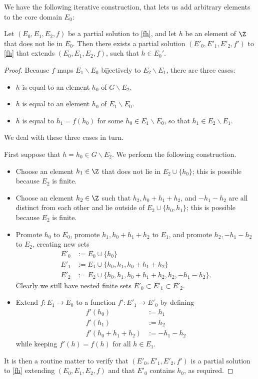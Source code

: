 We have the following iterative construction, that lets us add arbitrary elements to the core domain $E_0$:

\begin{lemma}\label{iteration} Let $(E_0, E_1, E_2, f)$ be a partial solution to \eqref{fh}, and let $h$ be an element of $\Z$ that does not lie in $E_0$.  Then there exists a partial solution $(E'_0, E'_1, E'_2, f')$ to \eqref{fh} that extends $(E_0, E_1, E_2, f)$, such that $h \in E_0'$.
\end{lemma}

\begin{proof}  Because $f$ maps $E_1 \backslash E_0$ bijectively to $E_2 \backslash E_1$, there are three cases:
\begin{itemize}
  \item $h$ is equal to an element $h_0$ of $G \backslash E_2$.
  \item $h$ is equal to an element $h_0$ of $E_1 \backslash E_0$.
  \item $h$ is equal to $h_1 = f(h_0)$ for some $h_0 \in E_1 \backslash E_0$, so that $h_1 \in E_2 \backslash E_1$.
\end{itemize}

We deal with these three cases in turn.

First suppose that $h = h_0\in G \backslash E_2$.  We perform the following construction.

\begin{itemize}
  \item Choose an element $h_1 \in \Z$ that does not lie in $E_2 \cup \{h_0\}$; this is possible because $E_2$ is finite.
  \item Choose an element $h_2 \in \Z$ such that $h_2, h_0+h_1+h_2$, and $-h_1-h_2$ are all distinct from each other and lie outside of $E_2 \cup \{h_0, h_1\}$; this is possible because $E_2$ is finite.
  \item Promote $h_0$ to $E_0$, promote $h_1, h_0+h_1+h_2$ to $E_1$, and promote $h_2, -h_1-h_2$ to $E_2$, creating new sets
  \begin{align*}
    E'_0 &:= E_0 \cup \{h_0\} \\
    E'_1 &:= E_1 \cup \{h_0, h_1, h_0+h_1+h_2\} \\
    E'_2 &:= E_2 \cup \{h_0, h_1, h_0+h_1+h_2, h_2, -h_1-h_2\}.
  \end{align*}
  Clearly we still have nested finite sets $E'_0 \subset E'_1 \subset E'_2$.
  \item Extend $f : E_1 \to E_0$ to a function $f': E'_1 \to E'_0$ by defining
  \begin{align*}
    f'(h_0) &:= h_1 \\
    f'(h_1) &:= h_2 \\
    f'(h_0+h_1+h_2) &:= -h_1-h_2
  \end{align*}
  while keeping $f'(h)=f(h)$ for all $h \in E_1$.
\end{itemize}
It is then a routine matter to verify that $(E'_0,E'_1,E'_2,f')$ is a partial solution to \eqref{fh} extending $(E_0,E_1,E_2,f)$ and that $E'_0$ contains $h_0$, as required.


\end{proof}
